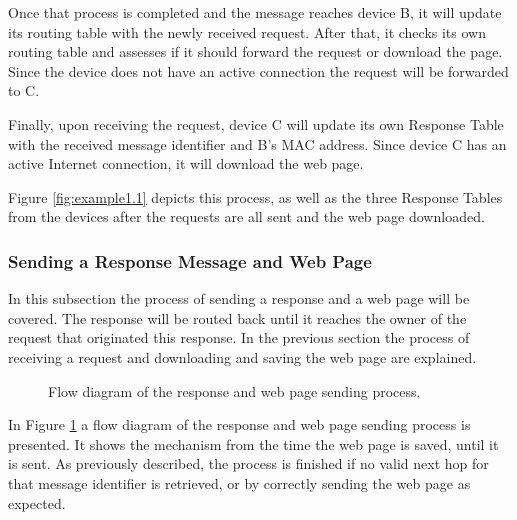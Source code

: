 Once that process is completed and the message reaches device B, it will update its routing table with the newly received request. After that, it checks its own routing table and assesses if it should forward the request or download the page. Since the device does not have an active connection the request will be forwarded to C.

Finally, upon receiving the request, device C will update its own Response Table with the received message identifier and B's \gls{MAC} address. Since device C has an active Internet connection, it will download the web page.

Figure \ref{fig:example1.1} depicts this process, as well as the three Response Tables from the devices after the requests are all sent and the web page downloaded.

\subsubsection{Sending a Response Message and Web Page}
\label{subsubsec:sendrsp}

In this subsection the process of sending a response and a web page will be covered. The response will be routed back until it reaches the owner of the request that originated this response. In the previous section the process of receiving a request and downloading and saving the web page are explained.

\begin{figure}[ht]
	\noindent{}
	\caption{\label{fig:rspsendflux} Flow diagram of the response and web page sending process.}
\end{figure}

In Figure \ref{fig:rspsendflux} a flow diagram of the response and web page sending process is presented. It shows the mechanism from the time the web page is saved, until it is sent. As previously described, the process is finished if no valid next hop for that message identifier is retrieved, or by correctly sending the web page as expected.


